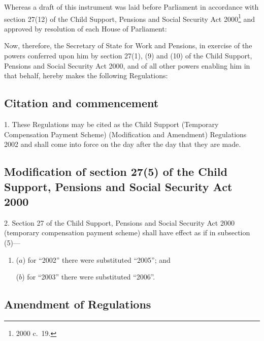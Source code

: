\documentclass[12pt,a4paper]{article}
\title{\regstitle}
\author{S.I.\ 2002 No.\ 1854}
\date{Made
16th July 2002\\
Coming into force
17th July 2002
}
\begin{document}
\maketitle

\noindent
Whereas a draft of this instrument was laid before Parliament in accordance with section 27(12) of the Child Support, Pensions and Social Security Act 2000\footnote{2000 c.\ 19.} and approved by resolution of each House of Parliament:

Now, therefore, the Secretary of State for Work and Pensions, in exercise of the powers conferred upon him by section 27(1), (9) and (10) of the Child Support, Pensions and Social Security Act 2000, and of all other powers enabling him in that behalf, hereby makes the following Regulations: 

{\sloppy

\tableofcontents

}

\bigskip

\setcounter{secnumdepth}{-2}

\subsection[1. Citation and commencement]{Citation and commencement}

1.  These Regulations may be cited as the Child Support (Temporary Compensation Payment Scheme) (Modification and Amendment) Regulations 2002 and shall come into force on the day after the day that they are made.

\subsection[2. Modification of section 27(5) of the Child Support, Pensions and Social Security Act 2000]{Modification of section 27(5) of the Child Support, Pensions and Social Security Act 2000}

2.  Section 27 of the Child Support, Pensions and Social Security Act 2000 (temporary compensation payment scheme) shall have effect as if in subsection (5)—
\begin{enumerate}\item[]
($a$) for “2002” there were substituted “2005”; and

($b$) for “2003” there were substituted “2006”.
\end{enumerate}

\subsection[3. Amendment of Regulations]{Amendment of Regulations}
\end{document}
